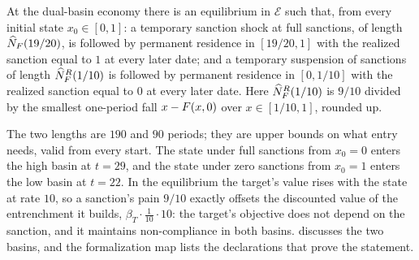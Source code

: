\begin{proposition}
\label{prop:two-sided-one-equilibrium}
At the dual-basin economy there is an equilibrium in $\mathcal E$ such that, from
every initial state $x_0\in[0,1]$: a temporary sanction shock at full sanctions,
of length $\widehat N_{F}(19/20)$, is followed by permanent residence in
$[19/20,1]$ with the realized sanction equal to $1$ at every later date; and a
temporary suspension of sanctions of length $\widehat N^{R}_{F}(1/10)$ is followed by
permanent residence in $[0,1/10]$ with the realized sanction equal to $0$ at
every later date. Here $\widehat N^{R}_{F}(1/10)$ is $9/10$ divided by the
smallest one-period fall $x-F(x,0)$ over $x\in[1/10,1]$, rounded up.
\end{proposition}

The two lengths are $190$ and $90$ periods; they are upper bounds on what entry
needs, valid from every start. The state under full sanctions from $x_0=0$
enters the high basin at $t=29$, and the state under zero sanctions from $x_0=1$
enters the low basin at $t=22$. In the equilibrium the target's value rises with the state at rate $10$,
so a sanction's pain $9/10$ exactly offsets the discounted value of the
entrenchment it builds, $\beta_T\cdot\tfrac1{10}\cdot10$: the target's objective
does not depend on the sanction, and it maintains non-compliance in both basins.
 discusses the two basins, and the formalization
map lists the declarations that prove the statement.

